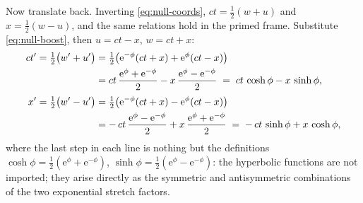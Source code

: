 \documentclass[11pt]{article}
\theoremstyle{plain}
\theoremstyle{definition}
\theoremstyle{remark}
\newcommand{\ee}{\mathrm{e}}
\begin{document}
Now translate back. Inverting \eqref{eq:null-coords},
$ct = \tfrac12(w+u)$ and $x = \tfrac12(w-u)$, and the same relations hold
in the primed frame. Substitute \eqref{eq:null-boost}, then
$u = ct - x$, $w = ct + x$:
\begin{align}
  ct' = \tfrac12\bigl(w' + u'\bigr)
      &= \tfrac12\bigl(\ee^{-\phi}(ct + x) + \ee^{\phi}(ct - x)\bigr)
      \notag\\
      &= ct\,\frac{\ee^{\phi} + \ee^{-\phi}}{2}
       - x\,\frac{\ee^{\phi} - \ee^{-\phi}}{2}
       \;=\; ct\,\cosh\phi - x\,\sinh\phi,
  \notag\\[2pt]
  x'  = \tfrac12\bigl(w' - u'\bigr)
      &= \tfrac12\bigl(\ee^{-\phi}(ct + x) - \ee^{\phi}(ct - x)\bigr)
      \notag\\
      &= -\,ct\,\frac{\ee^{\phi} - \ee^{-\phi}}{2}
       + x\,\frac{\ee^{\phi} + \ee^{-\phi}}{2}
       \;=\; -\,ct\,\sinh\phi + x\,\cosh\phi ,
  \label{eq:hyperbolic-rotation}
\end{align}
where the last step in each line is nothing but the definitions
$\cosh\phi = \tfrac12(\ee^{\phi} + \ee^{-\phi})$,
$\sinh\phi = \tfrac12(\ee^{\phi} - \ee^{-\phi})$: the hyperbolic
functions are not imported; they arise directly as the symmetric and
antisymmetric combinations of the two exponential stretch factors.
\end{document}
